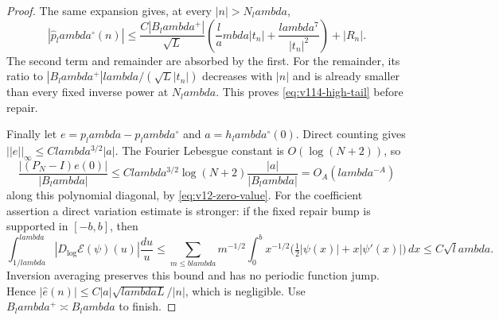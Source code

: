 \documentclass[11pt]{article}
\def\lambda{lambda}%
\def\norm#1{||#1||}%
\theoremstyle{remark}
\newcommand{\norm}[1]{\left\lVert #1\right\rVert}
\begin{document}
\begin{proof}
The same expansion gives, at every $|n|>N_\lambda$,
\[
 |\widehat p_\lambda^\circ(n)|
 \le \frac{C|B_\lambda^+|}{\sqrt L}
       \left(\frac\lambda{|t_n|}+\frac{\lambda^7}{|t_n|^2}\right)
       +|R_n|.
\]
The second term and remainder are absorbed by the first. For the remainder,
its ratio to $|B_\lambda^+|\lambda/(\sqrt L|t_n|)$ decreases with $|n|$
and is already smaller than every fixed inverse power at $N_\lambda$.
This proves \eqref{eq:v114-high-tail} before repair.

Finally let $e=p_\lambda-p_\lambda^\circ$ and
$a=h_\lambda^\circ(0)$. Direct counting gives
$\norm e_\infty\le C\lambda^{3/2}|a|$.
The Fourier Lebesgue constant is $O(\log(N+2))$, so
\[
 \frac{|(P_N-I)e(0)|}{|B_\lambda|}
 \le C\lambda^{3/2}\log(N+2)\frac{|a|}{|B_\lambda|}
       =O_A(\lambda^{-A})
\]
along this polynomial diagonal, by \eqref{eq:v12-zero-value}.
For the coefficient assertion a direct variation estimate is stronger:
if the fixed repair bump is supported in $[-b,b]$, then
\[
 \int_{1/\lambda}^{\lambda}|D_{\log}\mathcal E(\psi)(u)|\frac{du}{u}
 \le \sum_{m\le b\lambda}m^{-1/2}
   \int_0^b x^{-1/2}\bigl(\tfrac12|\psi(x)|+x|\psi'(x)|\bigr)\,dx
 \le C\sqrt\lambda.
\]
Inversion averaging preserves this bound and has no periodic function
jump. Hence $|\widehat e(n)|\le C|a|\sqrt{\lambda L}/|n|$, which is
negligible. Use $B_\lambda^+\asymp B_\lambda$ to finish.
\end{proof}
\end{document}
